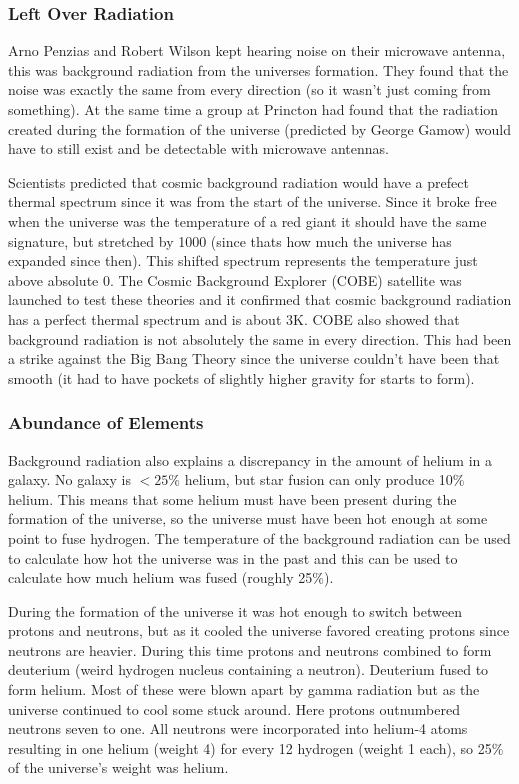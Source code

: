 \subsubsection{Left Over Radiation}
Arno Penzias and Robert Wilson kept hearing noise on their microwave antenna, this was background radiation from the universes formation. They found that the noise was exactly the same from every direction (so it wasn't just coming from something). At the same time a group at Princton had found that the radiation created during the formation of the universe (predicted by George Gamow) would have to still exist and be detectable with microwave antennas.

Scientists predicted that cosmic background radiation would have a prefect thermal spectrum since it was from the start of the universe. Since it broke free when the universe was the temperature of a red giant it should have the same signature, but stretched by 1000 (since thats how much the universe has expanded since then). This shifted spectrum represents the temperature just above absolute 0. The Cosmic Background Explorer (COBE) satellite was launched to test these theories and it confirmed that cosmic background radiation has a perfect thermal spectrum and is about 3K. COBE also showed that background radiation is not absolutely the same in every direction. This had been a strike against the Big Bang Theory since the universe couldn't have been that smooth (it had to have pockets of slightly higher gravity for starts to form).

\subsubsection{Abundance of Elements}
Background radiation also explains a discrepancy in the amount of helium in a galaxy. No galaxy is $<25\%$ helium, but star fusion can only produce 10\% helium. This means that some helium must have been present during the formation of the universe, so the universe must have been hot enough at some point to fuse hydrogen. The temperature of the background radiation can be used to calculate how hot the universe was in the past and this can be used to calculate how much helium was fused (roughly 25\%).

During the formation of the universe it was hot enough to switch between protons and neutrons, but as it cooled the universe favored creating protons since neutrons are heavier. During this time protons and neutrons combined to form deuterium (weird hydrogen nucleus containing a neutron). Deuterium fused to form helium. Most of these were blown apart by gamma radiation but as the universe continued to cool some stuck around. Here protons outnumbered neutrons seven to one. All neutrons were incorporated into helium-4 atoms resulting in one helium (weight 4) for every 12 hydrogen (weight 1 each), so 25\% of the universe's weight was helium.

